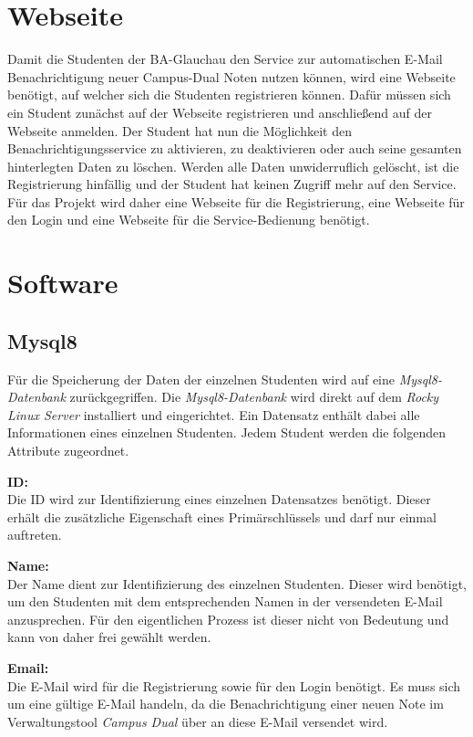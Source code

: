 \section{Webseite}
Damit die Studenten der BA-Glauchau den Service zur automatischen E-Mail Benachrichtigung neuer Campus-Dual Noten nutzen können, wird eine Webseite benötigt, auf welcher sich die Studenten registrieren können.
Dafür müssen sich ein Student zunächst auf der Webseite registrieren und anschließend auf der Webseite anmelden.
Der Student hat nun die Möglichkeit den Benachrichtigungsservice zu aktivieren, zu deaktivieren oder auch seine gesamten hinterlegten Daten zu löschen.
Werden alle Daten unwiderruflich gelöscht, ist die Registrierung hinfällig und der Student hat keinen Zugriff mehr auf den Service.
Für das Projekt wird daher eine Webseite für die Registrierung, eine Webseite für den Login und eine Webseite für die Service-Bedienung benötigt.

\section{Software}

\subsection{Mysql8}
Für die Speicherung der Daten der einzelnen Studenten wird auf eine \textit{Mysql8-Datenbank} zurückgegriffen.
Die \textit{Mysql8-Datenbank} wird direkt auf dem \textit{Rocky Linux Server} installiert und eingerichtet.
Ein Datensatz enthält dabei alle Informationen eines einzelnen Studenten.
Jedem Student werden die folgenden Attribute zugeordnet.

\textbf{ID:}\\
Die ID wird zur Identifizierung eines einzelnen Datensatzes benötigt.
Dieser erhält die zusätzliche Eigenschaft eines Primärschlüssels und darf nur einmal auftreten.

\textbf{Name:}\\
Der Name dient zur Identifizierung des einzelnen Studenten.
Dieser wird benötigt, um den Studenten mit dem entsprechenden Namen in der versendeten E-Mail anzusprechen.
Für den eigentlichen Prozess ist dieser nicht von Bedeutung und kann von daher frei gewählt werden.

\textbf{Email:}\\
Die E-Mail wird für die Registrierung sowie für den Login benötigt.
Es muss sich um eine gültige E-Mail handeln, da die Benachrichtigung einer neuen Note im Verwaltungstool \textit{Campus Dual} über an diese E-Mail versendet wird.

